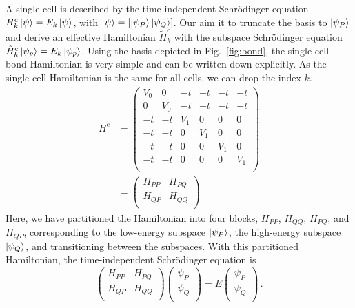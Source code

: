 A single  cell is described by the time-independent Schr\"odinger
equation $H^\text{c}_k \left|\psi\right> = E_k \left|\psi\right>$, with $\left|\psi\right> = \left[
\left|\psi_P\right> \left|\psi_Q\right> \right]$. Our aim it to truncate the basis to
$\left|\psi_P\right>$ and derive an effective Hamiltonian $\tilde{H}^\text{c}_k$ with the
subspace Schr\"odinger equation $\tilde{H}^\text{c}_k \left|\psi_p\right> = E_k \left|\psi_p\right>$.
Using the basis depicted in Fig.~\ref{fig:bond}, the single-cell bond
Hamiltonian is very simple and can be written down explicitly. As the
single-cell Hamiltonian is the same for all cells, we can drop the index $k$.
%
\begin{equation}
\begin{split}
  \label{eq:H_marix}
  H^\text{c}
  &=
  \left(
  \begin{array}{cc|cccc}
    V_0 & 0   & -t  & -t  & -t  & -t  \\
    0   & V_0 & -t  & -t  & -t  & -t  \\
    \hline
    -t  & -t  & V_1 & 0   & 0   & 0   \\
    -t  & -t  & 0   & V_1 & 0   & 0   \\
    -t  & -t  & 0   & 0   & V_1 & 0   \\
    -t  & -t  & 0   & 0   & 0   & V_1 \\
  \end{array}
  \right) \\[1em]
  &=
  \left(
  \begin{array}{cc}
    H_{PP} & H_{PQ} \\
    H_{QP} & H_{QQ} \\
  \end{array}
  \right)
\end{split}
\end{equation}
%
Here, we have partitioned the Hamiltonian into four blocks, $H_{PP}$, $H_{QQ}$,
$H_{PQ}$, and $H_{QP}$, corresponding to the low-energy subspace $\left|\psi_P\right>$,
the high-energy subspace $\left|\psi_Q\right>$, and transitioning between the subspaces.
With this partitioned Hamiltonian, the time-independent Schr\"odinger equation is
%
\begin{equation}
  \label{eq:SE}
  \begin{pmatrix}
    H_{PP} & H_{PQ} \\
    H_{QP} & H_{QQ} \\
  \end{pmatrix}
  \begin{pmatrix}
    \psi_P \\
    \psi_Q \\
  \end{pmatrix}
  =
  E
  \begin{pmatrix}
    \psi_P \\
    \psi_Q \\
  \end{pmatrix}
  \, .
\end{equation}
